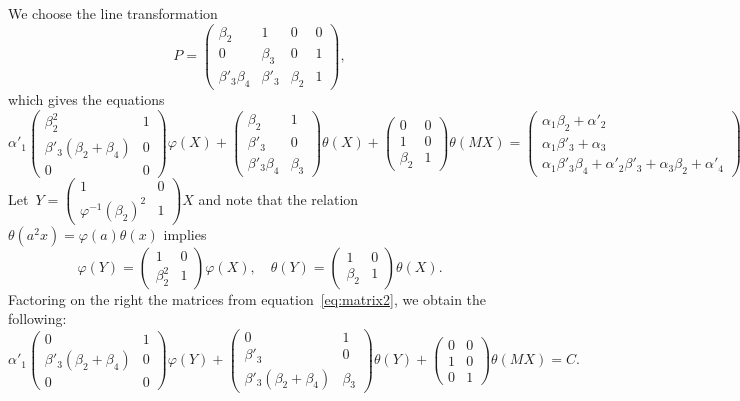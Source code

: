 \documentclass{llncs}
\def\mat#1{\begin{pmatrix}#1\end{pmatrix}}
\begin{document}
We choose the line transformation
\begin{equation}\label{eq:line-transform}
P = \mat{ β_2 & 1 & 0 & 0 \\ 0 & β_3 & 0 & 1 \\ β'_3 β_4 & β'_3 & β_2 & 1},
\end{equation}
which gives the equations
\begin{equation}\label{eq:matrix2}
α'_1 \mat{β_2^2 & 1 \\ β'_3 (β_2 + β_4) & 0 \\ 0 & 0} φ (X)
+ \mat{β_2 & 1 \\ β'_3 & 0 \\ β'_3 β_4 & β_3} θ (X)
+ \mat{0 & 0 \\ 1 & 0 \\ β_2 & 1} θ (MX) =
\mat{α_1 β_2 + α'_2 \\ α_1 β'_3 + α_3 \\
α_1 β'_3 β_4 + α'_2 β'_3 + α_3 β_2 + α'_4}.
\end{equation}
Let~$Y = \mat{1 & 0 \\ φ^{-1}(β_2)^2 & 1} X$ and note that the
relation~$θ(a^2 x) = φ(a) θ(x)$ implies
\begin{equation}
φ(Y) = \mat{1 & 0 \\ β_2^2 & 1} φ(X), \quad
θ(Y) = \mat{1 & 0 \\ β_2 & 1} θ(X).
\end{equation}
Factoring on the right the matrices from equation~\eqref{eq:matrix2}, we
obtain the following:
\begin{equation}\label{eq:matrix3}
α'_1 \mat{0 & 1 \\β'_3 (β_2 + β_4) & 0 \\ 0 & 0} φ(Y)
+ \mat{0 & 1 \\ β'_3 & 0 \\ β'_3(β_2 + β_4) & β_3} θ(Y)
+ \mat{0 & 0 \\ 1 & 0 \\ 0 & 1} θ(MX) = C.
\end{equation}
\end{document}
